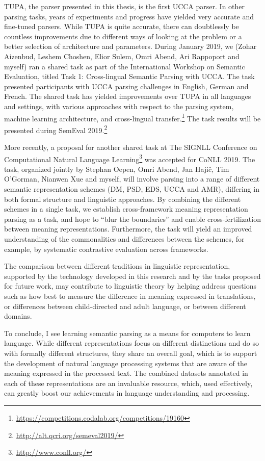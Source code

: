 \documentclass[12pt,a4paper,table]{report}
\begin{document}
TUPA, the parser presented in this thesis, is the first UCCA parser.
In other parsing tasks, years of experiments and progress have yielded very
accurate and fine-tuned parsers.
While TUPA is quite accurate, there can doubtlessly be countless improvements
due to different ways of looking at the problem or a better selection of architecture
and parameters.
During January 2019, we (Zohar Aizenbud, Leshem Choshen, Elior Sulem, Omri Abend,
Ari Rappoport and myself) ran a shared task as part of the
International Workshop on Semantic Evaluation, titled
Task 1: Cross-lingual Semantic Parsing with UCCA.
The task presented participants with UCCA parsing challenges
in English, German and French.
The shared task has yielded improvements over TUPA
in all languages and settings,
with various approaches with respect to the parsing system,
machine learning architecture, and cross-lingual
transfer.\footnote{\url{https://competitions.codalab.org/competitions/19160}}
The task results will be presented during SemEval
2019.\footnote{\url{http://alt.qcri.org/semeval2019/}}

More recently, a proposal for another shared task at
The SIGNLL Conference on Computational Natural Language
Learning\footnote{\url{http://www.conll.org/}} was accepted for CoNLL 2019.
The task, organized jointly by Stephan Oepen, Omri Abend, Jan Haji\v{c},
Tim O'Gorman, Nianwen Xue and myself,
will involve parsing into a range of different semantic representation schemes
(DM, PSD, EDS, UCCA and AMR), differing in both formal structure and linguistic
approaches.
By combining the different schemes in a single task, we
establish cross-framework meaning representation parsing as a task,
and hope to ``blur the boundaries'' and enable cross-fertilization between
meaning representations.
Furthermore, the task will yield an improved understanding of the commonalities
and differences between the schemes, for example, by systematic contrastive evaluation
across frameworks.

The comparison between different traditions in linguistic representation,
supported by the technology developed in this research
and by the tasks proposed for future work,
may contribute to linguistic theory by helping address questions such as
how best to measure the difference in meaning expressed in translations,
or differences between child-directed and adult language,
or between different domains.

To conclude, I see learning semantic parsing as a means for computers to learn language.
While different representations focus on different distinctions and do so
with formally different structures, they share an overall goal,
which is to support the development of natural language processing systems
that are aware of the meaning expressed in the processed text.
The combined datasets annotated in each of these representations are an invaluable
resource, which, used effectively, can greatly boost our achievements in
language understanding and processing.
\end{document}

